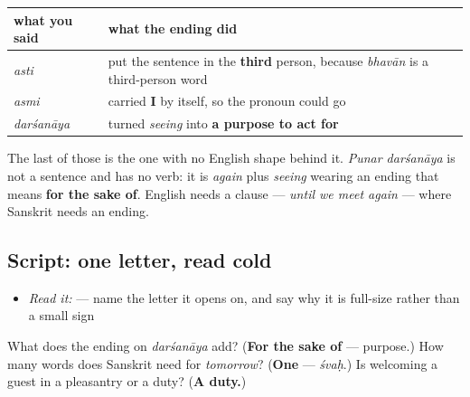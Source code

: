 \begin{grammarlens}[title={Grammar Lens: three endings doing three jobs}]
\noindent
\begin{tabularx}{\linewidth}{@{}>{\raggedright\arraybackslash}X>{\raggedright\arraybackslash}X@{}}
\toprule
\textbf{what you said} & \textbf{what the ending did} \\
\midrule
\emph{asti} & put the sentence in the \textbf{third} person, because \emph{bhavān} is a third-person word \\
\emph{asmi} & carried \textbf{I} by itself, so the pronoun could go \\
\emph{darśanāya} & turned \emph{seeing} into \textbf{a purpose to act for} \\
\bottomrule
\end{tabularx}

The last of those is the one with no English shape behind it. \emph{Punar darśanāya} is not a sentence and has no verb: it is \emph{again} plus \emph{seeing} wearing an ending that means \textbf{for the sake of}. English needs a clause — \emph{until we meet again} — where Sanskrit needs an ending.
\end{grammarlens}

\subsection*{Script: one letter, read cold}
\begin{itemize}
\raggedright
  \item \emph{Read it:} \textbf{} — name the letter it opens on, and say why it is full-size rather than a small sign
\end{itemize}

\begin{tcolorbox}[breakable,colback=teal!4,colframe=teal!35!black,title={Before you move on}]
What does the ending on \emph{darśanāya} add? (\textbf{For the sake of} — purpose.) How many words does Sanskrit need for \emph{tomorrow}? (\textbf{One} — \emph{śvaḥ}.) Is welcoming a guest in a pleasantry or a duty? (\textbf{A duty.})
\end{tcolorbox}
